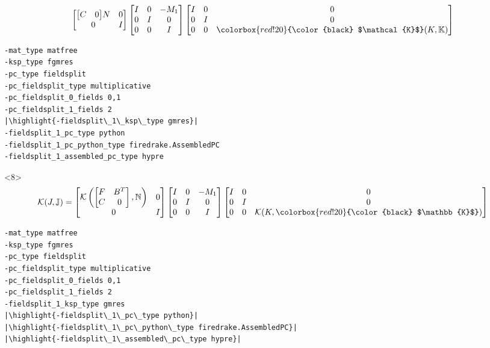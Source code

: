 \documentclass[presentation]{beamer}
\newcommand{\KSP}[2]{\ensuremath{\mathcal{K}\left(#1, \mathbb{#2}\right)}}
\newcommand{\highlight}[1]{\colorbox{red!20}{\color{black} #1}}
\begin{document}
\begin{frame}[fragile]
\begin{onlyenv}
\begin{equation*}
\begin{bmatrix}
{\begin{bmatrix}
            C & 0
          \end{bmatrix}}{N} & 0\\
        0 & I
      \end{bmatrix}
      \begin{bmatrix}
        I & 0 & -M_1\\
        0 & I & 0 \\
        0 & 0 & I
      \end{bmatrix}
      \begin{bmatrix}
        I & 0 & 0\\
        0 & I & 0\\
        0 & 0 & \highlight{$\mathcal{K}$}(K, \mathbb{K})
      \end{bmatrix}
    \end{equation*}
\begin{verbatim}
-mat_type matfree
-ksp_type fgmres
-pc_type fieldsplit
-pc_fieldsplit_type multiplicative
-pc_fieldsplit_0_fields 0,1
-pc_fieldsplit_1_fields 2
|\highlight{-fieldsplit\_1\_ksp\_type gmres}|
-fieldsplit_1_pc_type python
-fieldsplit_1_pc_python_type firedrake.AssembledPC
-fieldsplit_1_assembled_pc_type hypre
\end{verbatim}
  \end{onlyenv}
  \begin{onlyenv}<8>
    \color{gray}
    \begin{equation*}
      \mathcal{K}(J, \mathbb{J}) =
      \begin{bmatrix}
        \KSP{\begin{bmatrix}
            F & B^T\\
            C & 0
          \end{bmatrix}}{N} & 0\\
        0 & I
      \end{bmatrix}
      \begin{bmatrix}
        I & 0 & -M_1\\
        0 & I & 0 \\
        0 & 0 & I
      \end{bmatrix}
      \begin{bmatrix}
        I & 0 & 0\\
        0 & I & 0\\
        0 & 0 & \mathcal{K}(K, \highlight{$\mathbb{K}$})
      \end{bmatrix}
    \end{equation*}
\begin{verbatim}
-mat_type matfree
-ksp_type fgmres
-pc_type fieldsplit
-pc_fieldsplit_type multiplicative
-pc_fieldsplit_0_fields 0,1
-pc_fieldsplit_1_fields 2
-fieldsplit_1_ksp_type gmres
|\highlight{-fieldsplit\_1\_pc\_type python}|
|\highlight{-fieldsplit\_1\_pc\_python\_type firedrake.AssembledPC}|
|\highlight{-fieldsplit\_1\_assembled\_pc\_type hypre}|
\end{verbatim}
  \end{onlyenv}
\end{frame}
\end{document}
